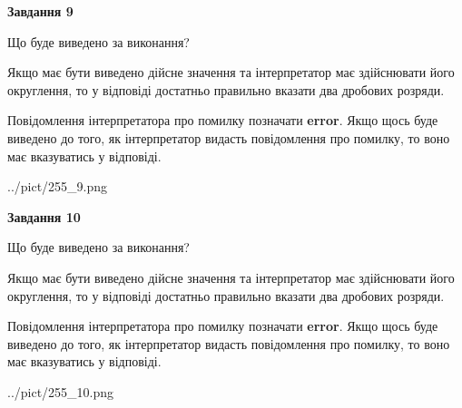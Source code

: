 \documentclass[12pt, ukrainian]{article}
\begin{document}
{\begin {Large}
{\begin {center}\textbf{Завдання 9}\end {center}}\par
Що буде виведено за виконання? \par

Якщо має бути виведено дійсне значення та інтерпретатор має здійснювати його округлення, 
то у відповіді достатньо правильно вказати два дробових розряди.

Повідомлення інтерпретатора про помилку позначати \textbf{error}.
Якщо щось буде виведено до того, як інтерпретатор видасть повідомлення про помилку, 
то воно має вказуватись у відповіді. \par

\begin{center}
	{../pict/255_9.png}
\end{center}
\newpage

{\begin {center}\textbf{Завдання 10}\end {center}}\par
Що буде виведено за виконання? \par

Якщо має бути виведено дійсне значення та інтерпретатор має здійснювати його округлення, 
то у відповіді достатньо правильно вказати два дробових розряди.

Повідомлення інтерпретатора про помилку позначати \textbf{error}.
Якщо щось буде виведено до того, як інтерпретатор видасть повідомлення про помилку, 
то воно має вказуватись у відповіді. \par

\begin{center}
	{../pict/255_10.png}
\end{center}
\newpage

\end {Large}}
\end{document}
